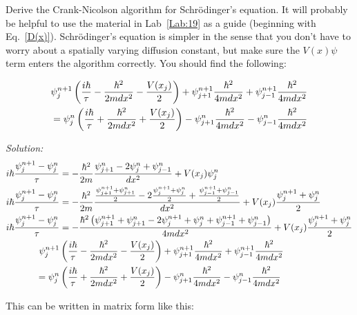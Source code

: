 \begin{enumerate}
    \probtwo \label{P:23.1} 
\begin{enumerate}
\subprob Derive the Crank-Nicolson algorithm for Schr\"{o}dinger's
  equation.  It will probably be helpful to use the material in
  Lab~\ref{Lab:19} as a guide (beginning with Eq.~\eqref{D(x)}).
  Schr\"{o}dinger's equation is simpler in the sense that you don't
  have to worry about a spatially varying diffusion constant, but make
  sure the $V(x)\psi$ term enters the algorithm correctly. You should
  find the following:

\begin{align}
\psi_j^{n+1} \left ({i \hbar\over \tau} - {\hbar^2\over 2 m dx^2} -
  {V(x_j)\over 2} \right) + \psi_{j+1}^{n+1} {\hbar^2\over 4 m dx^2} +
\psi_{j-1}^{n+1} {\hbar^2\over 4 m dx^2} &\\
= \psi_j^n \left ({i \hbar\over \tau} + {\hbar^2\over 2 m dx^2} +
  {V(x_j)\over 2} \right) - \psi_{j+1}^n {\hbar^2\over 4 m dx^2} -
\psi_{j-1}^n {\hbar^2\over 4 m dx^2}& 
\end{align}

\end{enumerate}
\ifsolutions
\textit{Solution:}\\
\begin{align}
i \hbar{\psi_j^{n+1} - \psi_j^n\over \tau} &= - {\hbar^2\over 2 m}
{\psi^n_{j+1} - 2\psi_j^n + \psi_{j-1}^n\over dx^2} + V(x_j) \psi_j^n\\
i \hbar{\psi_j^{n+1} - \psi_j^n\over \tau} &= - {\hbar^2\over 2 m}
{{\psi_{j+1}^{n+1} + \psi_{j+1}^n\over 2} - 2 {\psi_j^{n+1} +
    \psi_j^n\over 2} + {\psi_{j-1}^{n+1} + \psi_{j-1}^n\over 2}\over
  dx^2} + V(x_j) {\psi_j^{n+1} + \psi_j^n\over 2}\\
i \hbar{\psi_j^{n+1} - \psi_j^n\over \tau} &= - 
{\hbar^2\left(\psi_{j+1}^{n+1} + \psi_{j+1}^n - 2 \psi_j^{n+1} +
    \psi_j^n + \psi_{j-1}^{n+1} + \psi_{j-1}^n\right)\over 4mdx^2} + V(x_j) {\psi_j^{n+1} + \psi_j^n\over 2}\\
\psi_j^{n+1} &\left ({i \hbar\over \tau} - {\hbar^2\over 2 m dx^2} -
  {V(x_j)\over 2} \right) + \psi_{j+1}^{n+1} {\hbar^2\over 4 m dx^2} +
\psi_{j-1}^{n+1} {\hbar^2\over 4 m dx^2} \\
= \psi_j^n &\left({i \hbar\over \tau} + {\hbar^2\over 2 m dx^2} +
  {V(x_j)\over 2} \right) - \psi_{j+1}^n {\hbar^2\over 4 m dx^2} -
\psi_{j-1}^n {\hbar^2\over 4 m dx^2} 
\end{align}

This can be written in matrix form like this:


\end{enumerate}
